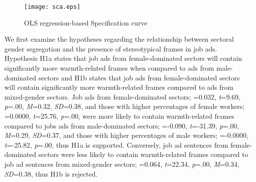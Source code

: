 \documentclass[man]{apa7}
\begin{document}
\begin{figure}
    \caption{OLS regression-based Specification curve}
    \label{fig:sca}
    \centering
    \texttt{[image: sca.eps]}
    \raggedright{}
\end{figure}

We first examine the hypotheses regarding the relationship between sectoral gender segregation and the presence of stereotypical frames in job ads. Hypothesis H1a states that job ads from female-dominated sectors will contain significantly more warmth-related frames when compared to ads from male-dominated sectors and H1b states that job ads from female-dominated sectors will contain significantly more warmth-related frames compared to ads from mixed-gender sectors. Job ads from female-dominated sectors; \textit{\textbeta}=0.032, \textit{t}=9.69, \textit{p}=.00, \textit{M}=0.32, \textit{SD}=0.38, and those with higher percentages of female workers; \textit{\textbeta}=0.0000, \textit{t}=25.76, \textit{p}=.00, were more likely to contain warmth-related frames compared to jobs ads from male-dominated sectors; \textit{\textbeta}=-0.090, \textit{t}=-31.39, \textit{p}=.00, \textit{M}=0.29, \textit{SD}=0.37, and those with higher percentages of male workers; \textit{\textbeta}=-0.0000, \textit{t}=-25.82, \textit{p}=.00, thus H1a is supported. Conversely, job ad sentences from female-dominated sectors were less likely to contain warmth-related frames compared to job ad sentences from mixed-gender sectors; \textit{\textbeta}=0.064, \textit{t}=22.34, \textit{p}=.00, \textit{M}=0.34, \textit{SD}=0.38, thus H1b is rejected.
\end{document}
